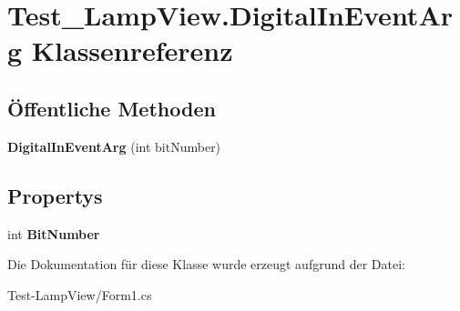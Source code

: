 \hypertarget{class_test___lamp_view_1_1_digital_in_event_arg}{
\section{Test\_\-LampView.DigitalInEventArg Klassenreferenz}
\label{class_test___lamp_view_1_1_digital_in_event_arg}
}
\subsection*{Öffentliche Methoden}
\begin{DoxyCompactItemize}
\item 
\hypertarget{class_test___lamp_view_1_1_digital_in_event_arg_aa6c7168600403e69cb571cc76094ecfe}{
{\bfseries DigitalInEventArg} (int bitNumber)}
\label{class_test___lamp_view_1_1_digital_in_event_arg_aa6c7168600403e69cb571cc76094ecfe}

\end{DoxyCompactItemize}
\subsection*{Propertys}
\begin{DoxyCompactItemize}
\item 
\hypertarget{class_test___lamp_view_1_1_digital_in_event_arg_afc917ab4e6171a391729b90baec28168}{
int {\bfseries BitNumber}}
\label{class_test___lamp_view_1_1_digital_in_event_arg_afc917ab4e6171a391729b90baec28168}

\end{DoxyCompactItemize}


Die Dokumentation für diese Klasse wurde erzeugt aufgrund der Datei:\begin{DoxyCompactItemize}
\item 
Test-\/LampView/Form1.cs\end{DoxyCompactItemize}
